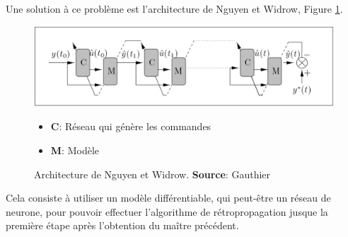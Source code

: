 Une solution à ce problème est l'architecture de Nguyen et Widrow, Figure \ref{appNguyenWidrow}.
\begin{figure}
 \centering
 \includegraphics[scale=0.5]{../figures/appNguyenWidrow.jpg}
 \begin{itemize}
  \item \textbf{C}: Réseau qui génère les commandes
  \item \textbf{M}: Modèle
 \end{itemize}
 \caption{Architecture de Nguyen et Widrow. \textbf{Source}: Gauthier\cite{Gauthier}}
 \label{appNguyenWidrow}
\end{figure}
Cela consiste à utiliser un modèle différentiable, qui peut-être un réseau de neurone, pour pouvoir effectuer l'algorithme de rétropropagation jusque la première étape après l'obtention du maître précédent.